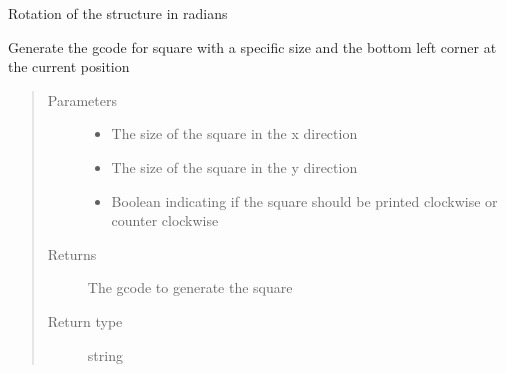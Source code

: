 \documentclass[letterpaper,10pt,english]{sphinxmanual}
\begin{document}
\begin{fulllineitems}
\begin{fulllineitems}
\label{\detokenize{index:generator.generator.rotation}}
\sphinxAtStartPar
Rotation of the structure in radians

\end{fulllineitems}


\begin{fulllineitems}
\label{\detokenize{index:generator.generator.square}}
\sphinxAtStartPar
Generate the gcode for square with a specific size and the bottom left corner at the current position
\begin{quote}\begin{description}
\item[{Parameters}] \leavevmode\begin{itemize}
\item {} 
\sphinxAtStartPar
{} \textendash{} The size of the square in the x direction

\item {} 
\sphinxAtStartPar
{} \textendash{} The size of the square in the y direction

\item {} 
\sphinxAtStartPar
{} \textendash{} Boolean indicating if the square should be printed clockwise or counter clockwise

\end{itemize}

\item[{Returns}] \leavevmode
\sphinxAtStartPar
The gcode to generate the square

\item[{Return type}] \leavevmode
\sphinxAtStartPar
string

\end{description}\end{quote}

\end{fulllineitems}



\end{fulllineitems}
\end{document}
